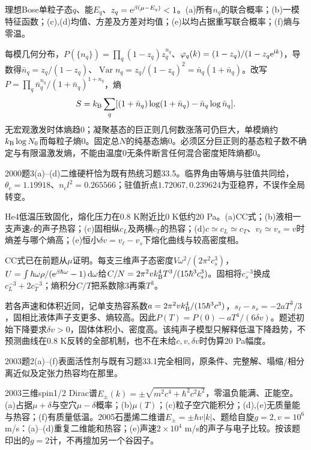 \begin{exercise}[2000题2(a)--(f)]\label{f:333-2000-2}
理想Bose单粒子态$q$、能$E_q$、$z_q=\mathrm e^{\beta(\mu-E_q)}<1$。(a)所有$n_q$的联合概率；(b)一模特征函数；(c),(d)均值、方差及方差对均值；(e)以均占据重写联合概率；(f)熵与零温。
\end{exercise}
\begin{solution}
每模几何分布，$P(\{n_q\})=\prod_q(1-z_q)z_q^{n_q}$、$\varphi_q(k)=(1-z_q)/(1-z_q\mathrm e^{\mathrm i k})$，导数得$\bar n_q=z_q/(1-z_q)$、$\operatorname{Var}n_q=z_q/(1-z_q)^2=\bar n_q(1+\bar n_q)$。改写$P=\prod_q\bar n_q^{n_q}/(1+\bar n_q)^{1+n_q}$，熵
\begin{equation}
S=k_{\mathrm B}\sum_q[(1+\bar n_q)\log(1+\bar n_q)-\bar n_q\log\bar n_q].
\end{equation}
无宏观激发时体熵趋0；凝聚基态的巨正则几何数涨落可仍巨大，单模熵约$k_{\mathrm B}\log N_0$而每粒子熵0。固定总$N$的纯基态熵0。必须区分巨正则的基态粒子数不确定与有限温激发熵，不能由温度0无条件断言任何混合密度矩阵熵都0。
\end{solution}
2000题3(a)--(d)二维硬杆恰为既有热统习题33.5。临界角由等熵与驻值共同给，$\theta_c=1.19918$、$n_cl^2=0.265566$；驻值折点$1.72067,0.239624$为亚稳界，不误作全局转变。
\begin{exercise}[2003题1及2006题1，均(a)--(e)]\label{f:333-he4}
He4低温压致固化，熔化压力在0.8 K附近比0 K低约20 Pa。(a)CC式；(b)液相一支声速$c$的声子热容；(c)固相纵$c_L$及两横$c_T$的热容；(d)$c\simeq c_L\simeq c_T$、$v_\ell\simeq v_s=v$时熵差与哪个熵高；(e)恒小$\delta v=v_\ell-v_s$下熔化曲线与较高密度相。
\end{exercise}
\begin{solution}
CC式已在前题从$\mu$证明。每支三维声子态密度$V\omega^2/(2\pi^2c_s^3)$，$U=\int\hbar\omega\rho/(\mathrm e^{\beta\hbar\omega}-1)\,\mathrm d\omega$给$C/N=2\pi^2vk_{\mathrm B}^4T^3/(15\hbar^3c_s^3)$。固相将$c_s^{-3}$换成$c_L^{-3}+2c_T^{-3}$；熵积分$C/T$把系数除3再乘$T^3$。

若各声速和体积近同，记单支热容系数$a=2\pi^2vk_{\mathrm B}^4/(15\hbar^3c^3)$，$s_\ell-s_s=-2aT^3/3$，固相比液体声子支更多、熵较高。因此$P(T)=P(0)-aT^4/(6\delta v)$。题述初始下降要求$\delta v>0$，固体体积小、密度高。该纯声子模型只解释低温下降趋势，不预测曲线在0.8 K反转的全部机制，也不在未给$c,v,\delta v$时伪算20 Pa幅度。
\end{solution}
2003题2(a)--(f)表面活性剂与既有习题33.1完全相同，原条件、完整解、塌缩/相分离近似及定张力热容均在那里。
\begin{exercise}[2003题3(a)--(f)；2005题1(a)--(e)]\label{f:333-dirac}
2003三维spin1/2 Dirac谱$E_\pm(k)=\pm\sqrt{m^2c^4+\hbar^2c^2k^2}$，零温负能满、正能空。(a)占据$\mu+\delta$与空穴$\mu-\delta$概率；(b)$\mu(T)$；(c)粒子空穴能积分；(d),(e)无质量能与热容；(f)有质量低温。2005石墨烯二维谱$E_\pm=\pm\hbar v|k|$、题给自旋$g=2,v=10^6$ m/s：(a)--(d)重复二维能和热容；(e)声速$2\times10^4$ m/s的声子与电子比较。按该题印出的$g=2$计，不再擅加另一个谷因子。
\end{exercise}
